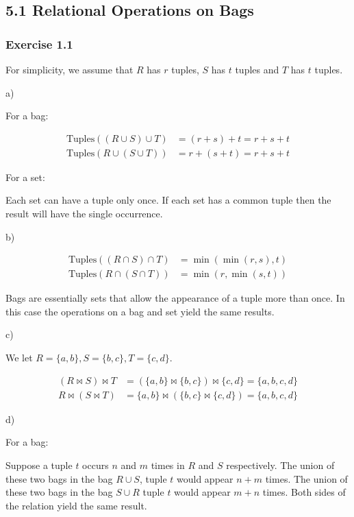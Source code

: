 \documentclass[../../main.tex]{subfiles}
\begin{document}
\subsection*{5.1 Relational Operations on Bags}

\subsubsection*{Exercise 1.1}

For simplicity, we assume that $R$ has $r$ tuples, $S$ has
$t$ tuples and $T$ has $t$ tuples.

a)

For a bag:

\begin{align*}
  \mbox{Tuples}((R \cup S) \cup T) &= (r + s) + t = r + s + t \\
  \mbox{Tuples}(R \cup (S \cup T)) &= r + (s + t) = r + s + t
\end{align*}

For a set:

Each set can have a tuple only once. If each set has a
common tuple then the result will have the single occurrence.

b)

\begin{align*}
  \mbox{Tuples}((R \cap S) \cap T) &= \min(\min(r, s), t) \\
  \mbox{Tuples}(R \cap (S \cap T)) &= \min(r, \min(s, t))
\end{align*}


Bags are essentially sets that allow the appearance of a
tuple more than once. In this case the operations on
a bag and set yield the same results.

c)

We let $R = \{a, b\}, S = \{b, c\}, T = \{c, d\}$.

\begin{align*}
  (R \bowtie S) \bowtie T &=
    (\{a, b\} \bowtie \{b, c\}) \bowtie \{c, d\} = \{a, b, c, d\} \\
  R \bowtie (S \bowtie T) &=
    \{a, b\} \bowtie (\{b, c\} \bowtie \{c, d\}) = \{a, b, c, d\}
\end{align*}

d)

For a bag:

Suppose a tuple $t$ occurs $n$ and $m$ times in $R$ and $S$
respectively. The union of these two bags in the bag $R \cup S$,
tuple $t$ would appear $n+m$ times. The union of these two bags
in the bag $S \cup R$ tuple $t$ would appear $m+n$ times.
Both sides of the relation yield the same result.
\end{document}
